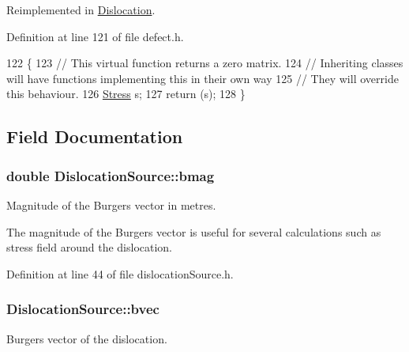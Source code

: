 Reimplemented in \hyperlink{classDislocation_af61cedf5305080ce0f55eb7177efe529}{Dislocation}.



Definition at line 121 of file defect.\-h.


\begin{DoxyCode}
122   \{
123     \textcolor{comment}{// This virtual function returns a zero matrix.}
124     \textcolor{comment}{// Inheriting classes will have functions implementing this in their own way}
125     \textcolor{comment}{// They will override this behaviour.}
126     \hyperlink{classStress}{Stress} s;
127     \textcolor{keywordflow}{return} (s);
128   \}
\end{DoxyCode}


\subsection{Field Documentation}
\hypertarget{classDislocationSource_a59c95f3cb5af5180d2c42792413f7816}{
\subsubsection[{bmag}]{\setlength{\rightskip}{0pt plus 5cm}double Dislocation\-Source\-::bmag\hspace{0.3cm}{\ttfamily [protected]}}}\label{de/de3/classDislocationSource_a59c95f3cb5af5180d2c42792413f7816}


Magnitude of the Burgers vector in metres. 

The magnitude of the Burgers vector is useful for several calculations such as stress field around the dislocation. 

Definition at line 44 of file dislocation\-Source.\-h.

\hypertarget{classDislocationSource_ade4753ac6106317c693c2bba4f83a568}{
\subsubsection[{bvec}]{ Dislocation\-Source\-::bvec\hspace{0.3cm}{\ttfamily [protected]}}}\label{de/de3/classDislocationSource_ade4753ac6106317c693c2bba4f83a568}


Burgers vector of the dislocation. 



